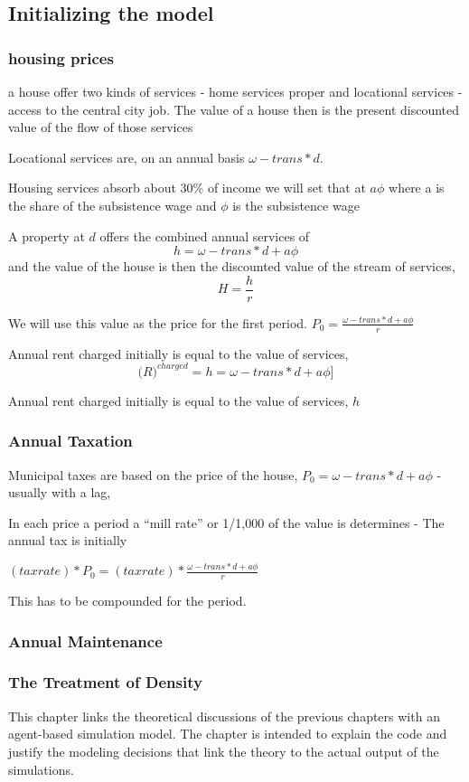 \newcommand{\ee}[1]{\color{red}#1 \color{black}}

\subsection{Initializing the model}
\subsubsection{housing prices}

a house offer two kinds of services - home services proper and locational services - access to the central city job. The value of a house then is the present discounted value of the flow of those services

Locational services are, on an annual basis $\omega- trans * d$.

Housing services absorb about 30\% of income  we will set that at $a\phi$ where a is the share of the subsistence wage and $\phi$
is the subsistence wage

A property at $d$ offers the combined annual services of 
\[h=\omega- trans * d + a\phi\]
and the value of the house is then the discounted value of the stream of services,
\[H=\frac{h}{r}\]

We will use this value as the price for the first period. 
 $P_0=\frac{\omega- trans * d + a\phi}{r}$


Annual rent charged initially is  equal to the value of services, \[\mathcal(R)^{charged}= h= \omega- trans * d + a\phi]\]



Annual rent charged initially is  equal to the value of services, $h$

\subsubsection{Annual Taxation}
Municipal taxes are based on the price of the house, $P_0=\omega- trans * d + a\phi$ - usually with a lag, 

In each price a period a ``mill rate'' or 1/1,000 of the value is determines - The annual tax is initially

 $(taxrate)*P_0=(taxrate)*\frac{\omega- trans * d + a\phi}{r}$

This has to be compounded for the period.

\subsubsection{Annual Maintenance}

\subsubsection{The Treatment of Density}

\newpage
This chapter links the theoretical discussions of the previous chapters with an agent-based simulation model. The chapter is intended to explain the code and justify the modeling decisions that link the theory to the actual output of the simulations.